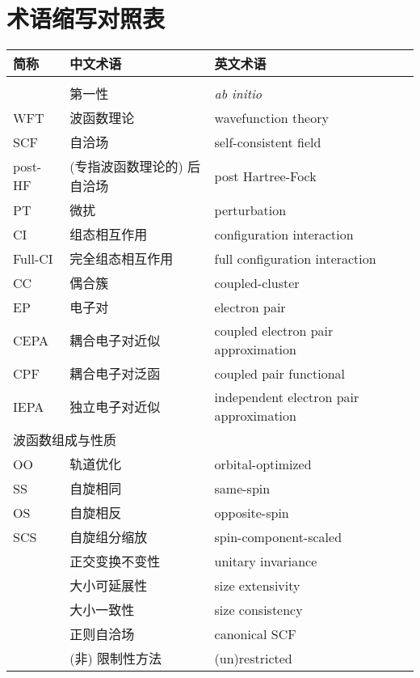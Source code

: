 
\chapter{术语缩写对照表}
\label{sec.app.notations}

\begingroup
\setlength{\LTleft}{-20cm plus -1fill}
\setlength{\LTright}{\LTleft}

\begin{longtable}{lll}
    \toprule 简称 & 中文术语 & 英文术语 \\ \midrule \endhead
    \bottomrule \endlastfoot
    \multicolumn{3}{l}{\textsf{波函数理论}} \\
    & 第一性 & \emph{ab initio} \\
    WFT & 波函数理论 & wavefunction theory \\
    SCF & 自洽场 & self-consistent field \\
    post-HF & (专指波函数理论的) 后自洽场 & post Hartree-Fock \\
    PT & 微扰 & perturbation \\
    CI & 组态相互作用 & configuration interaction \\
    Full-CI & 完全组态相互作用 & full configuration interaction \\
    CC & 偶合簇 & coupled-cluster \\
    EP & 电子对 & electron pair \\
    CEPA & 耦合电子对近似 & coupled electron pair approximation \\
    CPF & 耦合电子对泛函 & coupled pair functional \\
    IEPA & 独立电子对近似 & independent electron pair approximation \\
    \midrule
    \multicolumn{3}{l}{\textsf{波函数组成与性质}} \\
    OO & 轨道优化 & orbital-optimized \\
    SS & 自旋相同 & same-spin \\
    OS & 自旋相反 & opposite-spin \\
    SCS & 自旋组分缩放 & spin-component-scaled \\
    & 正交变换不变性 & unitary invariance \\
    & 大小可延展性 & size extensivity \\
    & 大小一致性 & size consistency \\
    & 正则自洽场 & canonical SCF \\
    & (非) 限制性方法 & (un)restricted \\

\end{longtable}
